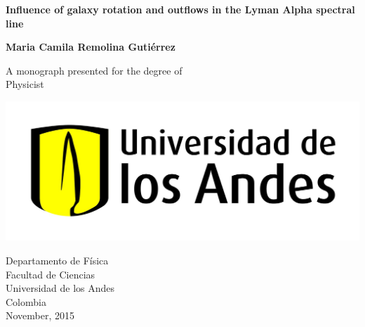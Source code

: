 
\setcounter{page}{1}

\newpage

\thispagestyle{empty}
\begin{center}
  \vspace*{1cm}
  {\Huge \bf Influence of galaxy rotation and outflows in the Lyman Alpha spectral line}

  \vspace*{2cm}
  {\LARGE\bf Maria Camila Remolina Guti\'errez}

  \vfill

  {\Large A monograph presented for the degree of\\
         [1mm] Physicist}
  \vspace*{0.9cm}
  
   \begin{center}
   \includegraphics[scale=0.12]{figures/uniandes.jpg}
   \end{center}

  {\large Departamento de F\'isica\\
		  [-3mm] Facultad de Ciencias\\
          [-3mm] Universidad de los Andes\\
          [-3mm] Colombia\\
          [1mm]  November, 2015}

\end{center}

